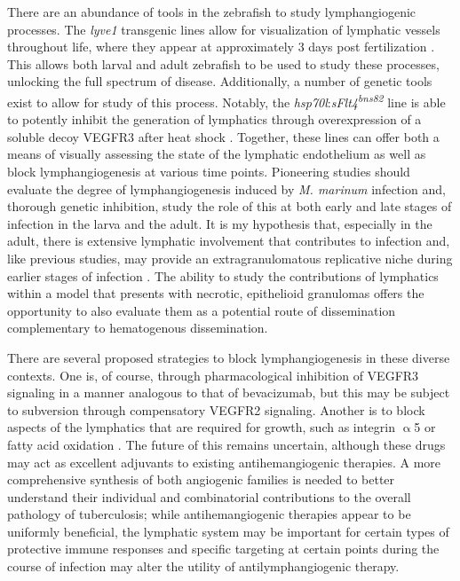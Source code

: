 There are an abundance of tools in the zebrafish to study lymphangiogenic processes. The \textit{lyve1} transgenic lines allow for visualization of lymphatic vessels throughout life, where they appear at approximately 3 days post fertilization \citep{Okuda2012}. This allows both larval and adult zebrafish to be used to study these processes, unlocking the full spectrum of disease. Additionally, a number of genetic tools exist to allow for study of this process. Notably, the \textit{hsp70l}:\textit{sFlt4\textsuperscript{bns82}} line is able to potently inhibit the generation of lymphatics through overexpression of a soluble decoy VEGFR3 after heat shock \citep{Matsuoka2016}. Together, these lines can offer both a means of visually assessing the state of the lymphatic endothelium as well as block lymphangiogenesis at various time points. Pioneering studies should evaluate the degree of lymphangiogenesis induced by \textit{M. marinum} infection and, thorough genetic inhibition, study the role of this at both early and late stages of infection in the larva and the adult. It is my hypothesis that, especially in the adult, there is extensive lymphatic involvement that contributes to infection and, like previous studies, may provide an extragranulomatous replicative niche during earlier stages of infection \citep{Lerner2016}. The ability to study the contributions of lymphatics within a model that presents with necrotic, epithelioid granulomas offers the opportunity to also evaluate them as a potential route of dissemination complementary to hematogenous dissemination. 

There are several proposed strategies to block lymphangiogenesis in these diverse contexts. One is, of course, through pharmacological inhibition of VEGFR3 signaling in a manner analogous to that of bevacizumab, but this may be subject to subversion through compensatory VEGFR2 signaling. Another is to block aspects of the lymphatics that are required for growth, such as integrin $\upalpha$5 \citep{Dietrich2007} or fatty acid oxidation \citep{Wong2017b}. The future of this remains uncertain, although these drugs may act as excellent adjuvants to existing antihemangiogenic therapies. A more comprehensive synthesis of both angiogenic families is needed to better understand their individual and combinatorial contributions to the overall pathology of tuberculosis; while antihemangiogenic therapies appear to be uniformly beneficial, the lymphatic system may be important for certain types of protective immune responses and specific targeting at certain points during the course of infection may alter the utility of antilymphangiogenic therapy.

